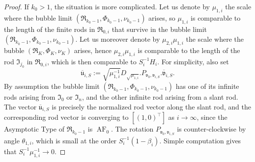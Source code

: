 \documentclass[a4paper,11pt]{amsart}
\theoremstyle{definition}
\numberwithin{equation}{section}
\newcommand{\mv} {\mathfrak v}
\newcommand{\mI} {\mathfrak I}
\newcommand{\mR} {\mathfrak R}
\DeclareMathOperator{\AF}{AF}
\begin{document}
\begin{proof}
If $k_0>1$, the situation is more complicated. Let us denote by $\mu_{1,i}$ the scale where the bubble limit $(\mR_{k_0-1},\Phi_{k_0-1},\nu_{k_0-1})$ arises, so $\mu_{1,i}$ is comparable to the length of the finite rods in $\mR_{0,i}$ that survive in the bubble limit $(\mR_{k_0-1},\Phi_{k_0-1},\nu_{k_0-1})$. Let us moreover denote by $\mu_{2,i}\mu_{1,i}$ the scale where the bubble $(\mR_{K},\Phi_{K},\nu_{K})$ arises, hence $\mu_{2,i}\mu_{1,i}$ is comparable to the length of the rod $\mI_{j_0}$ in $\mR_{0,i}$, which is then comparable to $S_i^{-1}H_i$.
For simplicity, also set 
\begin{equation}\label{eq:normalized rod vector u at k0-1}
    \overline{\mathfrak{u}}_{i,S}:=\sqrt{\mu_{1,i}^{-1}}D_{\sqrt{\mu_{1,i}}}.P_{\mv_0,\mv_{i,S}}.\overline{\mv}_{i,S}.
\end{equation}
By assumption the bubble limit $(\mR_{k_0-1},\Phi_{k_0-1},\nu_{k_0-1})$ has one of its infinite rods arising from $\mI_0$ or $\mI_n$, and the other infinite rod arising from a slant rod. 
The vector $\overline{\mathfrak{u}}_{i,S}$ is precisely the normalized rod vector along the slant rod, and the corresponding rod vector  is converging to $[(1,0)^\top]$ as $i\to\infty$, since the Asymptotic Type of $\mR_{k_0-1}$ is $\AF_0$. The rotation  $P_{\mv_0,\mv_{i,S}}$ is counter-clockwise by angle $\theta_{1,i}$, which is small at the order $S_i^{-1}(1-\beta_i)$. Simple computation gives that $S_i^{-1}\mu_{1,i}^{-1}\to0$.




\end{proof}
\end{document}
